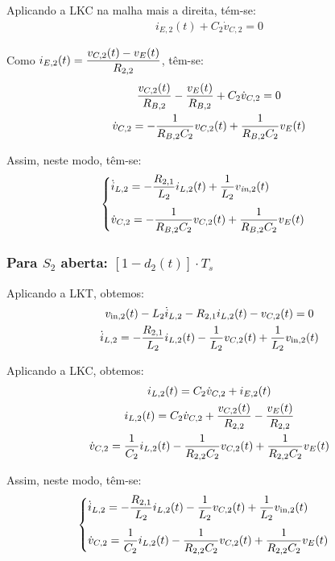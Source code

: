 Aplicando a LKC na malha mais a direita, tém-se:
\begin{gather}
  i_{E,2}(t) + C_2 \dot{v}_{C,2} = 0
\end{gather}

Como $i_{E,2}(t) = \displaystyle \frac{v_{C,2}(t) - v_E(t)}{R_{2,2}}$, têm-se:
\begin{gather}
  \frac{v_{C,2}(t)}{R_{B,2}} - \frac{v_E(t)}{R_{B,2}} + C_2 \dot{v}_{C,2} = 0 \nle
  \dot{v}_{C,2} = - \frac{1}{R_{B,2} C_2} v_{C,2}(t) + \frac{1}{R_{B,2} C_2} v_{E}(t)
\end{gather}

Assim, neste modo, têm-se:
\begin{gather}
  \begin{cases}
    \dot i_{L,2} = \displaystyle - \frac{R_{2,1}}{L_2} i_{L,2}(t) + \frac{1}{L_2} v_{\textit{in}, 2}(t) \\[12pt]
    \dot{v}_{C,2} = \displaystyle - \frac{1}{R_{B,2} C_2} v_{C,2}(t) + \frac{1}{R_{B,2} C_2} v_{E}(t)
  \end{cases}
\end{gather}

\vspace*{8pt}
\subsubsection*{Para $S_2$ aberta: $\left[1 - d_2(t)\right] \cdot T_s$}

Aplicando a LKT, obtemos:
\begin{gather}
  v_{\text{in}, 2}(t) - L_2 \dot i_{L,2} - R_{2,1} i_{L,2} (t) - v_{C,2} (t)= 0 \nle
  \dot i_{L,2} = - \frac{R_{2,1}}{L_2} i_{L,2}(t) - \frac{1}{L_2} v_{C,2}(t) + \frac{1}{L_2} v_{\text{in}, 2}(t)
\end{gather}

Aplicando a LKC, obtemos:
\begin{gather}
  i_{L,2}(t) = C_2 \dot v_{C,2} + i_{E,2}(t) \nle
  i_{L,2}(t) = C_2 \dot v_{C,2} +  \frac{v_{C,2}(t)}{R_{2,2}} - \frac{v_E(t)}{R_{2,2}} \nle
  \dot{v}_{C,2} =  \frac{1}{C_2} i_{L,2}(t) - \frac{1}{R_{2,2}C_2} v_{C,2}(t) + \frac{1}{R_{2,2} C_2} v_E(t)
\end{gather}

Assim, neste modo, têm-se:
\begin{gather}
  \begin{cases}
    \dot i_{L,2} = \displaystyle - \frac{R_{2,1}}{L_2} i_{L,2}(t) - \frac{1}{L_2} v_{C,2}(t) + \frac{1}{L_2} v_{\text{in}, 2}(t) \\[12pt]
    \dot{v}_{C,2} = \displaystyle \frac{1}{C_2} i_{L,2}(t) - \frac{1}{R_{2,2}C_2} v_{C,2}(t) + \frac{1}{R_{2,2} C_2} v_E(t)
  \end{cases}
\end{gather}

